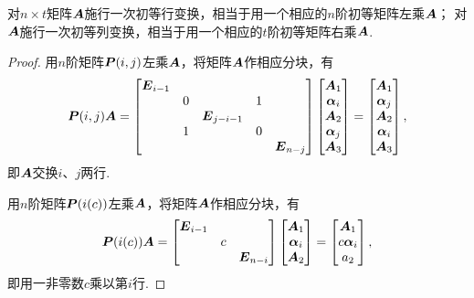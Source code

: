 \begin{property}\label{theorem:逆矩阵.初等矩阵的性质2}
对\(n \times t\)矩阵\(\boldsymbol{A}\)施行一次初等行变换，相当于用一个相应的\(n\)阶初等矩阵左乘\(\boldsymbol{A}\)；
对\(\boldsymbol{A}\)施行一次初等列变换，相当于用一个相应的\(t\)阶初等矩阵右乘\(\boldsymbol{A}\).
\begin{proof}
用\(n\)阶矩阵\(\boldsymbol{P}(i,j)\)左乘\(\boldsymbol{A}\)，将矩阵\(\boldsymbol{A}\)作相应分块，有\begin{equation*}
	\boldsymbol{P}(i,j) \boldsymbol{A} = \begin{bmatrix}
		\boldsymbol{E}_{i-1} \\
		& 0 & & 1 \\
		& & \boldsymbol{E}_{j-i-1} \\
		& 1 & & 0 \\
		& & & & \boldsymbol{E}_{n-j}
	\end{bmatrix}
	\begin{bmatrix}
		\boldsymbol{A}_1 \\ \boldsymbol\alpha_i \\ \boldsymbol{A}_2 \\ \boldsymbol\alpha_j \\ \boldsymbol{A}_3
	\end{bmatrix}
	= \begin{bmatrix}
		\boldsymbol{A}_1 \\ \boldsymbol\alpha_j \\ \boldsymbol{A}_2 \\ \boldsymbol\alpha_i \\ \boldsymbol{A}_3
	\end{bmatrix},
\end{equation*}
即\(\boldsymbol{A}\)交换\(i\)、\(j\)两行.

用\(n\)阶矩阵\(\boldsymbol{P}(i(c))\)左乘\(\boldsymbol{A}\)，将矩阵\(\boldsymbol{A}\)作相应分块，有\begin{equation*}
	\boldsymbol{P}(i(c)) \boldsymbol{A} = \begin{bmatrix}
		\boldsymbol{E}_{i-1} \\
		& c \\
		& & \boldsymbol{E}_{n-i}
	\end{bmatrix}
	\begin{bmatrix}
		\boldsymbol{A}_1 \\ \boldsymbol\alpha_i \\ \boldsymbol{A}_2
	\end{bmatrix}
	= \begin{bmatrix}
		\boldsymbol{A}_1 \\ c \boldsymbol\alpha_i \\ a_2
	\end{bmatrix},
\end{equation*}
即用一非零数\(c\)乘以第\(i\)行.


\end{proof}
\end{property}
